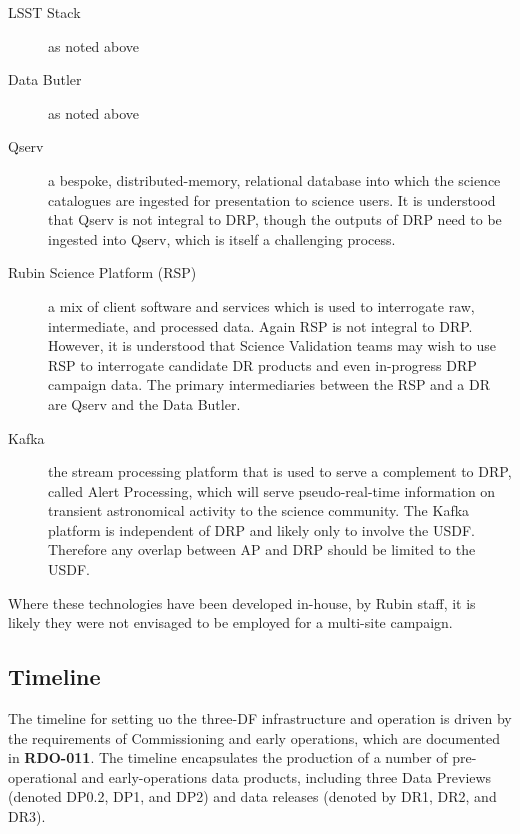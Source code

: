 \begin{description}

\item[LSST Stack] as noted above

\item[Data Butler] as noted above
  
\item[Qserv] a bespoke, distributed-memory, relational database into which the science catalogues are ingested for presentation to science users. It is understood that Qserv is not integral to DRP, though the outputs of DRP need to be ingested into Qserv, which is itself a challenging process.
  
\item[Rubin Science Platform (RSP)] a mix of client software and services which is used to interrogate raw, intermediate, and processed data. Again RSP is not integral to DRP. However, it is understood that Science Validation teams may wish to use RSP to interrogate candidate DR products and even in-progress DRP campaign data. The primary intermediaries between the RSP and a DR are Qserv and the Data Butler.

\item [Kafka] the stream processing platform that is used to serve a complement to DRP, called Alert Processing, which will serve pseudo-real-time information on transient astronomical activity to the science community. The Kafka platform is independent of DRP and likely only to involve the USDF. Therefore any overlap between AP and DRP should be limited to the USDF.

\end{description}

Where these technologies have been developed in-house, by Rubin staff, it is likely they were not envisaged to be employed for a multi-site campaign.


\subsection{Timeline}

The timeline for setting uo the three-DF infrastructure and operation is driven by the requirements of Commissioning and early operations, which are documented in {\bf RDO-011}. The timeline encapsulates the production of a number of pre-operational and early-operations data products, including three Data Previews (denoted DP0.2, DP1, and DP2) and data releases (denoted by DR1, DR2, and DR3).

